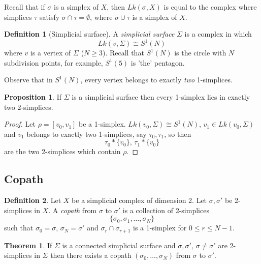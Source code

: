 \documentclass[a4paper,14pt]{extarticle}
\theoremstyle{definition}
\newtheorem*{theorem}{Theorem}
\newtheorem*{definition}{Definition}
\newtheorem*{proposition}{Proposition}
\begin{document}
Recall that if $\sigma$ is a simplex of $X$, then $Lk(\sigma, X)$ is equal to the complex where simplices $\tau$ satisfy $\sigma\cap\tau=\emptyset$, where $\sigma\cup\tau$ is a simplex
of $X$. \\

\begin{definition}[Simplicial surface]
	A \textit{simplicial surface} $\Sigma$ is a complex in which \[Lk(v,\Sigma)\cong S^1(N)\] where
$v$ is a vertex of $\Sigma$ ($N\geq3$). Recall that $S^1(N)$ is the circle with $N$ 
subdivision points, for example, $S^1(5)$ is 'the' pentagon.
\end{definition} 

Observe that in $S^1(N)$, every vertex belongs to exactly \emph{two} 1-simplices.

\begin{proposition}
	If $\Sigma$ is a simplicial surface then every 1-simplex lies in exactly two 2-simplices.
\end{proposition}

\begin{proof}
	Let $\rho=[v_0, v_1]$ be a 1-simplex. $Lk(v_0,\Sigma)\cong S^1(N)$, $v_1\in Lk(v_0,\Sigma)$
	and $v_1$ belongs to exactly two 1-simplices, say $\tau_0,\tau_1$, so then
	\[\tau_0*\{v_0\},\,\tau_1*\{v_0\}\] are the two 2-simplices which contain $\rho$.
\end{proof}


\subsection{Copath}
\begin{definition}
	Let $X$ be a simplicial complex of dimension 2. Let $\sigma,\sigma'$ be 2-simplices in 
	$X$. A \emph{copath} from $\sigma$ to $\sigma'$ is a collection of 2-simplices
	\[\{\sigma_0,\sigma_1,\ldots,\sigma_N\}\] such that $\sigma_0=\sigma,\,\sigma_N=\sigma'$
	and $\sigma_r\cap\sigma_{r+1}$ is a 1-simplex for $0\leq r\leq N-1$.
\end{definition}

\begin{theorem}
	If $\Sigma$ is a connected simplicial surface and $\sigma,\sigma', \,\sigma\neq\sigma'$ are 2-simplices in $\Sigma$ then there exists a copath $(\sigma_0,\ldots,\sigma_N)$ from 
	$\sigma$ to $\sigma'$.
\end{theorem}
\end{document}
